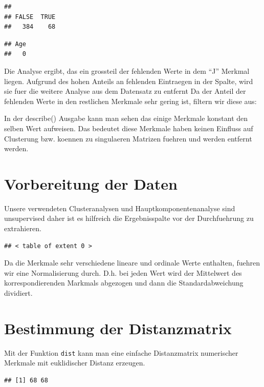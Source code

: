 \documentclass[
]{article}
\begin{document}
\begin{verbatim}
## 
## FALSE  TRUE 
##   384    68
\end{verbatim}

\begin{verbatim}
## Age 
##   0
\end{verbatim}

Die Analyse ergibt, das ein grossteil der fehlenden Werte in dem ``J''
Merkmal liegen. Aufgrund des hohen Anteils an fehlenden Eintraegen in
der Spalte, wird sie fuer die weitere Analyse aus dem Datensatz zu
entfernt Da der Anteil der fehlenden Werte in den restlichen Merkmale
sehr gering ist, filtern wir diese aus:

In der describe() Ausgabe kann man sehen das einige Merkmale konstant
den selben Wert aufweisen. Das bedeutet diese Merkmale haben keinen
Einfluss auf Clusterung bzw. koennen zu singulaeren Matrizen fuehren und
werden entfernt werden.

\hypertarget{vorbereitung-der-daten}{%
\section{Vorbereitung der Daten}\label{vorbereitung-der-daten}}

Unsere verwendeten Clusteranalysen und Hauptkomponentenanalyse sind
unsupervised daher ist es hilfreich die Ergebnisspalte vor der
Durchfuehrung zu extrahieren.

\begin{verbatim}
## < table of extent 0 >
\end{verbatim}

Da die Merkmale sehr verschiedene lineare und ordinale Werte enthalten,
fuehren wir eine Normalisierung durch. D.h. bei jeden Wert wird der
Mittelwert des korrespondierenden Markmals abgezogen und dann die
Standardabweichung dividiert.

\hypertarget{bestimmung-der-distanzmatrix}{%
\section{Bestimmung der
Distanzmatrix}\label{bestimmung-der-distanzmatrix}}

Mit der Funktion \texttt{dist} kann man eine einfache Distanzmatrix
numerischer Merkmale mit euklidischer Distanz erzeugen.

\begin{verbatim}
## [1] 68 68
\end{verbatim}
\end{document}
